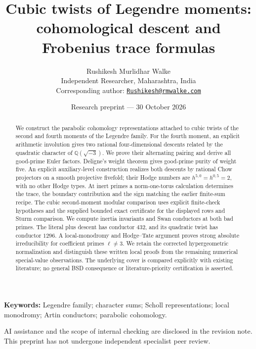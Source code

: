 \documentclass[11pt,a4paper]{article}
\title{Cubic twists of Legendre moments:\\cohomological descent and Frobenius trace formulas}
\author{Rushikesh Murlidhar Walke\\\small Independent Researcher, Maharashtra, India\\\small Corresponding author: \href{mailto:Rushikesh@rmwalke.com}{\texttt{Rushikesh@rmwalke.com}}}
\date{Research preprint --- 30 October 2026}
\newcommand{\Q}{\mathbb Q}\newcommand{\F}{\mathbb F}\newcommand{\Z}{\mathbb Z}
\theoremstyle{remark}\newtheorem{remark}[theorem]{Remark}
\begin{document}
\maketitle
\begin{abstract}
We construct the parabolic cohomology representations attached to cubic
twists of the second and fourth moments of the Legendre family. For the
fourth moment, an explicit arithmetic involution gives two rational
four-dimensional descents related by the quadratic character of
$\Q(\sqrt{-3})$. We prove their alternating pairing and derive all
good-prime Euler factors. Deligne's weight theorem gives good-prime
purity of weight five. An explicit auxiliary-level construction realizes
both descents by rational Chow projectors on a smooth projective fivefold;
their Hodge numbers are $h^{5,0}=h^{0,5}=2$, with no other Hodge types.
At inert primes a norm-one-torus calculation
determines the trace, the boundary contribution and the sign matching
the earlier finite-sum recipe. The cubic second-moment modular comparison
uses explicit finite-check hypotheses and the supplied bounded exact
certificate for the displayed rows and Sturm comparison.
We compute inertia invariants and Swan conductors at both bad primes.
The literal plus descent has conductor $432$, and its quadratic twist has
conductor $1296$. A local-monodromy and Hodge--Tate argument proves strong
absolute irreducibility for coefficient primes $\ell\ne3$.
We retain the corrected hypergeometric normalization and distinguish these
written local proofs from the remaining numerical special-value observations.
The underlying cover is compared explicitly with existing literature;
no general BSD consequence or literature-priority certification is asserted.
\end{abstract}
\noindent\textbf{Keywords:} Legendre family; character sums; Scholl representations; local monodromy; Artin conductors; parabolic cohomology.
\begin{center}\small
AI assistance and the scope of internal checking are disclosed in the revision note.\\
This preprint has not undergone independent specialist peer review.
\end{center}
\newpage
\setcounter{tocdepth}{1}
\begingroup\small\setlength{\parskip}{0pt}
\tableofcontents
\endgroup
\newpage














\appendix




\end{document}

